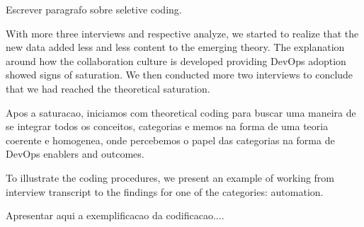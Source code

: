 Escrever paragrafo sobre seletive coding.

With more three interviews and respective analyze, we started to realize that
the new data added less and less content to the emerging theory. The
explanation around how the collaboration culture is developed providing
DevOps adoption showed signs of saturation. We then conducted more two 
interviews to conclude that we had reached the theoretical saturation.

Apos a saturacao, iniciamos com theoretical coding para buscar uma maneira
de se integrar todos os conceitos, categorias e memos na forma de uma teoria
coerente e homogenea, onde percebemos o papel das categorias na forma de
DevOps enablers and outcomes.

To illustrate the coding procedures, we present an example of working from
interview transcript to the findings for one of the categories: automation.

Apresentar aqui a exemplificacao da codificacao....
